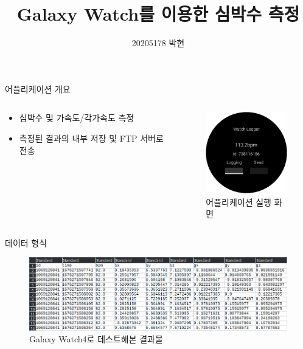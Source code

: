 \documentclass[aspectratio=169]{beamer}
\title{Galaxy Watch를 이용한 심박수 측정}
\date{}
\author{
    20205178 박현
}
\institute{한림대학교 정보과학대학}
\begin{document}
    \maketitle
    \begin{frame}{어플리케이션 개요}
        \begin{columns}
            \begin{column}{0.45\linewidth}
                \begin{itemize}
                    \item 심박수 및 가속도/각가속도 측정
                    \item 측정된 결과의 내부 저장 및 FTP 서버로 전송
                \end{itemize}
            \end{column}
            \begin{column}{0.45\linewidth}
                \begin{figure}
                    \centering
                    \includegraphics[width=4cm]{Screenshot_20230304_154020.png}
                    \caption{어플리케이션 실행 화면}
                \end{figure}
            \end{column}
        \end{columns}
    \end{frame}
    \begin{frame}{데이터 형식}
        \begin{figure}
            \centering
            \includegraphics[width=14cm]{Screenshot_20230304_153539.png}
            \caption{Galaxy Watch4로 테스트해본 결과물}
        \end{figure}
    \end{frame}
\end{document}
